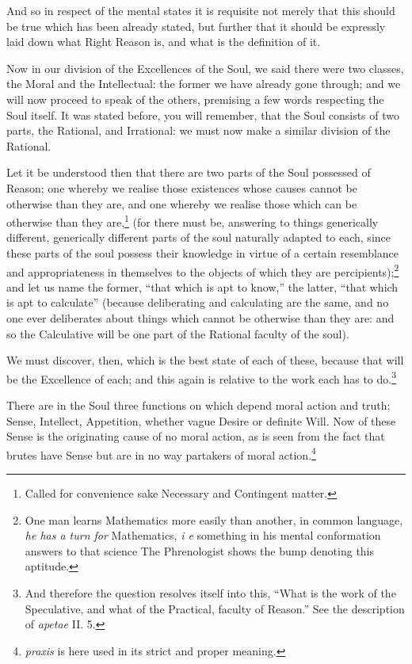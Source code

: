 And so in respect of the mental states it is requisite not merely that this
should be true which has been already stated, but further that it should be
expressly laid down what Right Reason is, and what is the definition of it.


Now in our division of the Excellences of the Soul, we said there were two
classes, the Moral and the Intellectual: the former we have already gone
through; and we will now proceed to speak of the others, premising a few words
respecting the Soul itself. It was stated before, you will remember, that the
Soul consists of two parts, the Rational, and Irrational: we must now make a
similar division of the Rational.

Let it be understood then that there are two parts of the Soul possessed of
Reason; one whereby we realise those existences whose causes cannot be
otherwise than they are, and one whereby we realise those which can be
otherwise than they are,\footnote{Called for convenience sake Necessary and Contingent matter.}
(for there must be, answering to things generically different, generically
different parts of the soul naturally adapted to each, since these parts of the
soul possess their knowledge in virtue of a certain resemblance and
appropriateness in themselves to the objects of which they are
percipients);\footnote{One man learns Mathematics more easily than another, in common language, \emph{he
has a turn for} Mathematics, \emph{i e} something in his mental conformation
answers to that science The Phrenologist shows the bump denoting this aptitude.}
and let us name the former, “that which is apt to know,” the
latter, “that which is apt to calculate” (because deliberating and
calculating are the same, and no one ever deliberates about things which cannot
be otherwise than they are: and so the Calculative will be one part of the
Rational faculty of the soul).

We must discover, then, which is the best state of each of these, because that
will be the Excellence of each; and this again is relative to the work each has
to do.\footnote{And therefore the question resolves itself into this, “What is the work
of the Speculative, and what of the Practical, faculty of Reason.” See
the description of \emph{apetae} II. 5.}

There are in the Soul three functions on which depend moral action and truth;
Sense, Intellect, Appetition, whether vague Desire or definite Will. Now of
these Sense is the originating cause of no moral action, as is seen from the
fact that brutes have Sense but are in no way partakers of moral
action.\footnote{\emph{praxis} is here used in its strict and proper meaning.}

